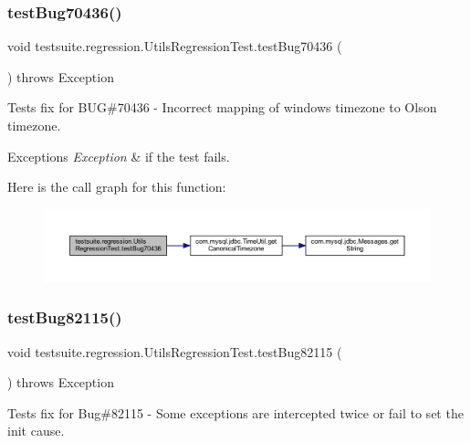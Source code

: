 \subsubsection{\texorpdfstring{test\+Bug70436()}{testBug70436()}}
{\footnotesize\ttfamily void testsuite.\+regression.\+Utils\+Regression\+Test.\+test\+Bug70436 (\begin{DoxyParamCaption}{ }\end{DoxyParamCaption}) throws Exception}

Tests fix for B\+UG\#70436 -\/ Incorrect mapping of windows timezone to Olson timezone.


\begin{DoxyExceptions}{Exceptions}
{\em Exception} & if the test fails. \\
\hline
\end{DoxyExceptions}
Here is the call graph for this function\+:
\nopagebreak
\begin{figure}[H]
\begin{center}
\leavevmode
\includegraphics[width=350pt]{classtestsuite_1_1regression_1_1_utils_regression_test_a29ccb38cafacb3d15f1610080cdc2d8a_cgraph}
\end{center}
\end{figure}
\mbox{\label{classtestsuite_1_1regression_1_1_utils_regression_test_a47cc76ff1bb97ee0755b21950e5387d0}} 
\subsubsection{\texorpdfstring{test\+Bug82115()}{testBug82115()}}
{\footnotesize\ttfamily void testsuite.\+regression.\+Utils\+Regression\+Test.\+test\+Bug82115 (\begin{DoxyParamCaption}{ }\end{DoxyParamCaption}) throws Exception}

Tests fix for Bug\#82115 -\/ Some exceptions are intercepted twice or fail to set the init cause. \mbox{\label{classtestsuite_1_1regression_1_1_utils_regression_test_a23afa0e1c5288ab757fb3e4c09676f79}} 
